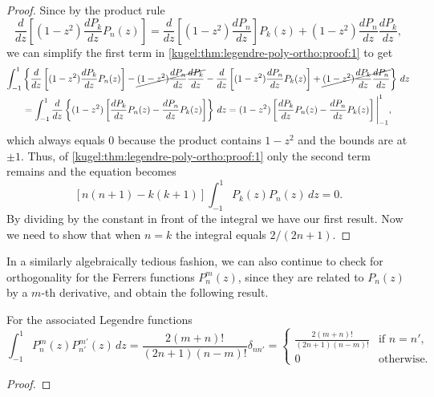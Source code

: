 \begin{proof}
  Since by the product rule
  \begin{equation*}
    \frac{d}{dz} \left[ (1 - z^2) \frac{dP_k}{dz} P_n(z) \right]
    =
    \frac{d}{dz} \left[ (1 - z^2) \frac{dP_n}{dz} \right] P_k(z)
      + (1 - z^2) \frac{dP_n}{dz} \frac{dP_k}{dz},
  \end{equation*}
  we can simplify the first term in
  \eqref{kugel:thm:legendre-poly-ortho:proof:1} to get
  \begin{gather*}
    \int_{-1}^1 \left\{
      \frac{d}{dz} \left[ (1 - z^2) \frac{dP_k}{dz} P_n(z) \right]
        - \cancel{(1 - z^2) \frac{dP_n}{dz} \frac{dP_k}{dz}}
        - \frac{d}{dz} \left[ (1 - z^2) \frac{dP_n}{dz} P_k(z) \right]
        + \cancel{(1 - z^2) \frac{dP_k}{dz} \frac{dP_n}{dz}}
    \right\} \, dz \\
    = \int_{-1}^1 \frac{d}{dz} \left\{ (1 - z^2) \left[
      \frac{dP_k}{dz} P_n(z) - \frac{dP_n}{dz} P_k(z)
    \right] \right\} \, dz
    = (1 - z^2) \left[
      \frac{dP_k}{dz} P_n(z) - \frac{dP_n}{dz} P_k(z)
    \right] \Bigg|_{-1}^1,
  \end{gather*}
  which always equals 0 because the product contains $1 - z^2$ and the bounds
  are at $\pm 1$. Thus, of \eqref{kugel:thm:legendre-poly-ortho:proof:1} only
  the second term remains and the equation becomes
  \begin{equation*}
    \left[ n(n+1) - k(k+1) \right] \int_{-1}^1 P_k(z) P_n(z) \, dz = 0.
  \end{equation*}
  By dividing by the constant in front of the integral we have our first result.
  Now we need to show that when $n = k$ the integral equals $2 / (2n + 1)$.
\end{proof}

In a similarly algebraically tedious fashion, we can also continue to check for
orthogonality for the Ferrers functions $P^m_n(z)$, since they are related to
$P_n(z)$ by a $m$-th derivative, and obtain the following result.

\begin{lemma} For the associated Legendre functions
  \label{kugel:thm:associated-legendre-ortho}
  \begin{equation*}
    \int_{-1}^1 P^m_n(z) P^{m'}_{n'}(z) \, dz
    = \frac{2(m + n)!}{(2n + 1)(n - m)!} \delta_{nn'}
    = \begin{cases}
      \frac{2(m + n)!}{(2n + 1)(n - m)!} & \text{if } n = n', \\
      0 & \text{otherwise}.
    \end{cases}
  \end{equation*}
\end{lemma}
\begin{proof}
\end{proof}

